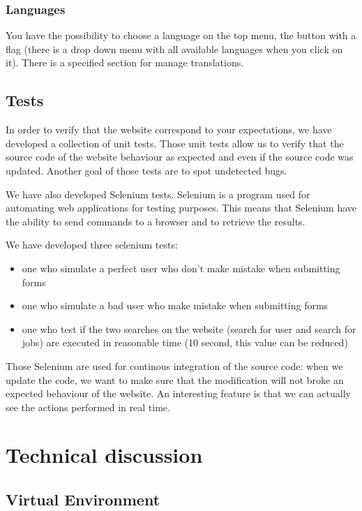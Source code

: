 \documentclass[11pt, a4paper]{article}      %
\begin{document}
\subsubsection{Languages}

You have the possibility to choose a language on the top menu, the button with a flag (there is a drop down menu with all available languages when you click on it). There is a specified section for manage translations.



\subsection{Tests}
In order to verify that the website correspond to your expectations, we have developed a collection of unit tests. Those unit tests allow us to verify that the source code of the website behaviour as expected and even if the source code was updated. Another goal of those tests are to spot undetected bugs.

We have also developed Selenium tests. Selenium is a program used for automating web applications for testing purposes. This means that Selenium have the ability to  send commands to a browser and to retrieve the results.

We have developed three selenium tests:

\begin{itemize}
\item one who simulate a perfect user who don't make mistake when submitting forms
\item one who simulate a bad user who make mistake when submitting forms 
\item one who test if the two searches on the website (search for user and search for jobs) are executed in reasonable time (10 second, this value can be reduced)
\end{itemize}

Those Selenium are used for continous integration of the source code: when we update the code, we want to make sure that the modification will not broke an expected behaviour of the website. An interesting feature is that we can actually see the actions performed in real time.


\section{Technical discussion}

\subsection{Virtual Environment}
\end{document}
